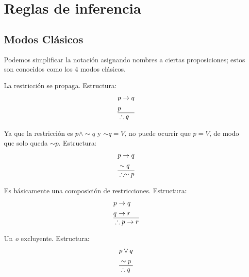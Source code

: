 \chapter{ Reglas de inferencia }

  \section{Modos Clásicos}

  Podemos simplificar la notación asignando nombres a ciertas
  proposiciones; estos son conocidos como los 4 modos clásicos.

  \begin{definition}[title={Modus Ponens}]
  La restricción se propaga. Estructura:
  \begin{align}
  &p \to q \\
  &p \\
  \hline
  &\therefore q
  \end{align}
  \end{definition}

  \begin{definition}[title={Modus Tollens}]
  Ya que la restricción es $p \land \sim q$ y $\sim q = V$, no puede
  ocurrir que $p = V$, de modo que solo queda $\sim p$. Estructura:
  \begin{align}
  &p \to q \\
  &\sim q \\
  \hline
  &\therefore \sim p
  \end{align}
  \end{definition}

  \begin{definition}[title={Silogismo Hipotético}]
  Es básicamente una composición de restricciones. Estructura:
  \begin{align}
  &p \to q \\
  &q \to r \\
  \hline
  &\therefore p \to r
  \end{align}
  \end{definition}

  \begin{definition}[title={Silogismo Disyuntivo}]
  Un \textit{o} excluyente. Estructura:
  \begin{align}
  &p \lor q \\
  &\sim p \\
  \hline
  &\therefore q
  \end{align}
  \end{definition}


